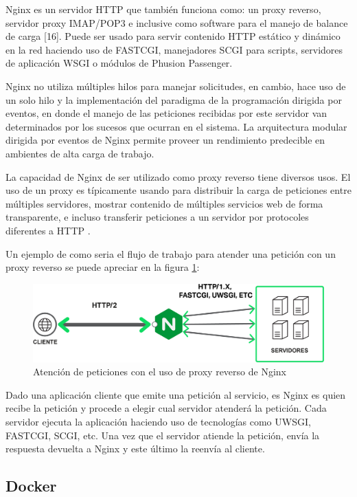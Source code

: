 Nginx es un servidor HTTP que también funciona como: un proxy reverso, servidor
proxy IMAP/POP3 e inclusive como software para el manejo de balance de carga [16].
Puede ser usado para servir contenido HTTP estático y dinámico en la red haciendo uso
de FASTCGI, manejadores SCGI para scripts, servidores de aplicación WSGI o módulos
de Phusion Passenger.

Nginx no utiliza múltiples hilos para manejar solicitudes, en cambio, hace uso de un
solo hilo y la implementación del paradigma de la programación dirigida por eventos,
en donde el manejo de las peticiones recibidas por este servidor van determinados por
los sucesos que ocurran en el sistema.
La arquitectura modular dirigida por eventos de
Nginx permite proveer un rendimiento predecible en ambientes de alta carga de
trabajo.

La capacidad de Nginx de ser utilizado como proxy reverso tiene diversos usos.
El uso de un proxy es típicamente usando para distribuir la carga de peticiones
entre múltiples servidores, mostrar contenido de múltiples servicios web de forma transparente,
e incluso transferir peticiones a un servidor por protocoles diferentes a HTTP \cite{22}.

Un ejemplo de como seria el flujo de trabajo para atender una petición con un proxy reverso se puede apreciar en la figura \ref{fig:nginx_reverse_proxy}:

\begin{figure}[H]
	\centering
		\includegraphics[width=.9\textwidth]{figures/nginx_reverse_proxy}
	\caption{Atención de peticiones con el uso de proxy reverso de Nginx}
	\label{fig:nginx_reverse_proxy}
\end{figure}

Dado una aplicación cliente que emite una petición al servicio, es Nginx es quien recibe la petición y procede a elegir cual servidor
atenderá la petición. Cada servidor ejecuta la aplicación haciendo uso de tecnologías como UWSGI, FASTCGI, SCGI, etc. Una vez que el
servidor atiende la petición, envía la respuesta devuelta a Nginx y este último la reenvía al cliente.


\subsection{Docker}

